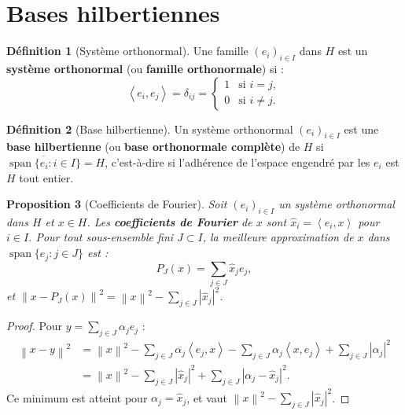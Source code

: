 \documentclass[a4paper,12pt]{book}
\DeclareMathOperator{\spn}{span}
\newcommand{\norm}[1]{\left\| #1 \right\|}
\newcommand{\abs}[1]{\left| #1 \right|}
\newcommand{\inner}[2]{\left\langle #1, #2 \right\rangle}
\theoremstyle{definition}
\newtheorem{definition}{Définition}[chapter]
\theoremstyle{plain}
\newtheorem{proposition}[definition]{Proposition}
\theoremstyle{remark}
\begin{document}
\section{Bases hilbertiennes}

\begin{definition}[Système orthonormal]\label{def:systeme-orthonormal}
Une famille $(e_i)_{i \in I}$ dans $H$ est un \textbf{système orthonormal} (ou \textbf{famille orthonormale}) si :
\[
    \inner{e_i}{e_j} = \delta_{ij} = \begin{cases} 1 & \text{si } i = j, \\ 0 & \text{si } i \neq j. \end{cases}
\]
\end{definition}

\begin{definition}[Base hilbertienne]\label{def:base-hilbertienne}
Un système orthonormal $(e_i)_{i \in I}$ est une \textbf{base hilbertienne} (ou \textbf{base orthonormale complète}) de $H$ si $\overline{\spn\{e_i : i \in I\}} = H$, c'est-à-dire si l'adhérence de l'espace engendré par les $e_i$ est $H$ tout entier.
\end{definition}

\begin{proposition}[Coefficients de Fourier]\label{prop:coeff-fourier}
Soit $(e_i)_{i \in I}$ un système orthonormal dans $H$ et $x \in H$. Les \textbf{coefficients de Fourier} de $x$ sont $\hat{x}_i = \inner{e_i}{x}$ pour $i \in I$. Pour tout sous-ensemble fini $J \subset I$, la meilleure approximation de $x$ dans $\spn\{e_j : j \in J\}$ est :
\[
    P_J(x) = \sum_{j \in J} \hat{x}_j e_j,
\]
et $\norm{x - P_J(x)}^2 = \norm{x}^2 - \sum_{j \in J} \abs{\hat{x}_j}^2$.
\end{proposition}

\begin{proof}
Pour $y = \sum_{j \in J} \alpha_j e_j$ :
\begin{align*}
    \norm{x - y}^2 &= \norm{x}^2 - \sum_{j \in J}\overline{\alpha_j}\inner{e_j}{x} - \sum_{j \in J}\alpha_j\inner{x}{e_j} + \sum_{j \in J}\abs{\alpha_j}^2 \\
    &= \norm{x}^2 - \sum_{j \in J}\abs{\hat{x}_j}^2 + \sum_{j \in J}\abs{\alpha_j - \hat{x}_j}^2.
\end{align*}
Ce minimum est atteint pour $\alpha_j = \hat{x}_j$, et vaut $\norm{x}^2 - \sum_{j \in J}\abs{\hat{x}_j}^2$.
\end{proof}
\end{document}
